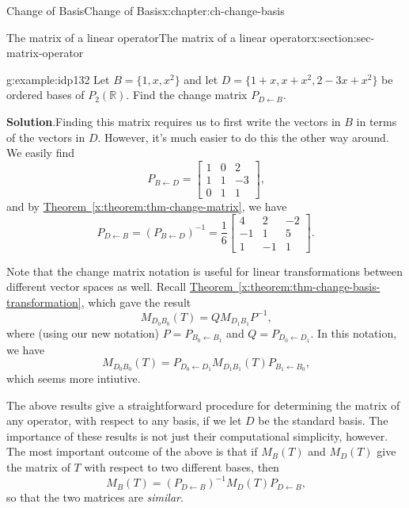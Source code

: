 \documentclass[oneside,10pt,]{book}
\newcommand{\blocktitlefont}{\relax}
\newcommand{\xreffont}{\relax}
\numberwithin{equation}{section}
\newcommand{\bbm}{\begin{bmatrix}}
\newcommand{\ebm}{\end{bmatrix}}
\newcommand{\R}{\mathbb{R}}
\newcommand{\amp}{&}
\begin{document}
\begin{chapterptx}{Change of Basis}{}{Change of Basis}{}{}{x:chapter:ch-change-basis}
\begin{sectionptx}{The matrix of a linear operator}{}{The matrix of a linear operator}{}{}{x:section:sec-matrix-operator}
\begin{example}{}{g:example:idp132}
Let \(B = \{1,x,x^2\}\) and let \(D = \{1+x,x+x^2,2-3x+x^2\}\) be ordered bases of \(P_2(\R)\). Find the change matrix \(P_{D\leftarrow B}\).%
\par\smallskip%
\noindent\textbf{\blocktitlefont Solution}.\hypertarget{g:solution:idp133}{}\quad{}Finding this matrix requires us to first write the vectors in \(B\) in terms of the vectors in \(D\). However, it's much easier to do this the other way around. We easily find%
\begin{equation*}
P_{B\leftarrow D} = \bbm 1\amp 0\amp 2\\1\amp 1\amp -3\\0\amp 1\amp 1\ebm\text{,}
\end{equation*}
and by \hyperref[x:theorem:thm-change-matrix]{Theorem~{\xreffont\ref{x:theorem:thm-change-matrix}}}, we have%
\begin{equation*}
P_{D\leftarrow B} = (P_{B\leftarrow D})^{-1} = \frac16\bbm 4\amp 2\amp -2\\-1\amp 1\amp 5\\1\amp -1\amp 1\ebm\text{.}
\end{equation*}
%
\end{example}
Note that the change matrix notation is useful for linear transformations between different vector spaces as well. Recall \hyperref[x:theorem:thm-change-basis-transformation]{Theorem~{\xreffont\ref{x:theorem:thm-change-basis-transformation}}}, which gave the result%
\begin{equation*}
M_{D_0B_0}(T) = QM_{D_1B_1}P^{-1}\text{,}
\end{equation*}
where (using our new notation) \(P=P_{B_0\leftarrow B_1}\) and \(Q=P_{D_0\leftarrow D_1}\). In this notation, we have%
\begin{equation*}
M_{D_0B_0}(T) = P_{D_0\leftarrow D_1}M_{D_1B_1}(T)P_{B_1\leftarrow B_0}\text{,}
\end{equation*}
which seems more intiutive.%
\par
The above results give a straightforward procedure for determining the matrix of any operator, with respect to any basis, if we let \(D\) be the standard basis. The importance of these results is not just their computational simplicity, however. The most important outcome of the above is that if \(M_B(T)\) and \(M_D(T)\) give the matrix of \(T\) with respect to two different bases, then%
\begin{equation*}
M_B(T) = (P_{D\leftarrow B})^{-1}M_D(T)P_{D\leftarrow B}\text{,}
\end{equation*}
so that the two matrices are \emph{similar}.%

\end{sectionptx}
\end{chapterptx}
\end{document}
